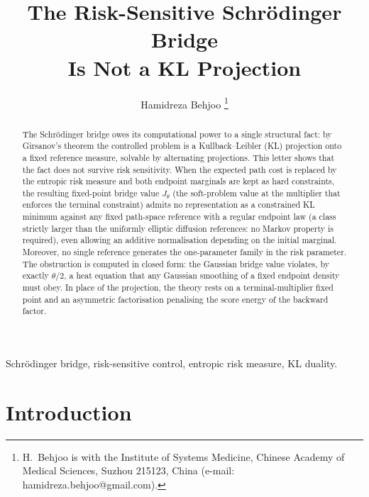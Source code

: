 \documentclass[letterpaper,10pt,conference]{IEEEtran}
\begin{document}
	\title{The Risk-Sensitive Schr\"odinger Bridge\\ Is Not a KL Projection}
	\author{Hamidreza Behjoo  \IEEEmembership{}
		\thanks{H.~Behjoo is with the Institute of Systems Medicine,
			Chinese Academy of Medical Sciences, Suzhou 215123, China
			(e-mail: hamidreza.behjoo@gmail.com).} }
	
	\maketitle
	\begin{abstract}
		The Schr\"odinger bridge owes its computational power to a single structural
		fact: by Girsanov's theorem the controlled problem is a Kullback--Leibler (KL)
		projection onto a fixed reference measure, solvable by alternating projections.
		This letter shows that the fact does not survive risk sensitivity. When the
		expected path cost is replaced by the entropic risk measure and both endpoint
		marginals are kept as hard constraints, the resulting fixed-point
		bridge value $J_\theta$ (the soft-problem value at the multiplier that enforces the terminal constraint) admits no representation as a constrained KL minimum against any fixed path-space
		reference with a regular endpoint law (a class strictly larger than the
		uniformly elliptic diffusion references: no Markov property is required),
		even allowing an additive
		normalisation depending on the initial marginal. Moreover, no single
		reference generates the one-parameter family in the risk parameter. The obstruction is
		computed in closed form: the Gaussian bridge value violates, by exactly
		$\theta/2$, a heat equation that any Gaussian smoothing of a fixed endpoint
		density must obey. In place of the projection, the theory rests on a
		terminal-multiplier fixed point and an asymmetric factorisation penalising the score energy
		of the backward factor.
	\end{abstract}
	
	\begin{IEEEkeywords}
		Schr\"odinger bridge, risk-sensitive control, entropic risk measure, KL
		duality.
	\end{IEEEkeywords}
	
	\section{Introduction}
	\label{sec:intro}
	
\end{document}
